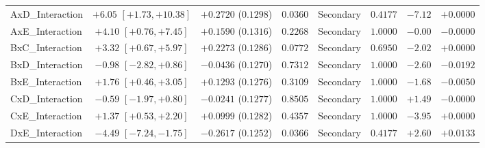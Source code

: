 \documentclass[10pt,journal,compsoc]{IEEEtran}
\begin{document}
\begin{table}[!t]
\begin{adjustbox}{max width=\textwidth}
\begin{tabular}{@{}lccccccc@{}}
AxD\_Interaction & $+6.05$ $[+1.73, +10.38]$ & $+0.2720$ ($0.1298$) & $0.0360$ & Secondary & $0.4177$ & $-7.12$ & $+0.0000$ \\
AxE\_Interaction & $+4.10$ $[+0.76, +7.45]$ & $+0.1590$ ($0.1316$) & $0.2268$ & Secondary & $1.0000$ & $-0.00$ & $-0.0000$ \\
BxC\_Interaction & $+3.32$ $[+0.67, +5.97]$ & $+0.2273$ ($0.1286$) & $0.0772$ & Secondary & $0.6950$ & $-2.02$ & $+0.0000$ \\
BxD\_Interaction & $-0.98$ $[-2.82, +0.86]$ & $-0.0436$ ($0.1270$) & $0.7312$ & Secondary & $1.0000$ & $-2.60$ & $-0.0192$ \\
BxE\_Interaction & $+1.76$ $[+0.46, +3.05]$ & $+0.1293$ ($0.1276$) & $0.3109$ & Secondary & $1.0000$ & $-1.68$ & $-0.0050$ \\
CxD\_Interaction & $-0.59$ $[-1.97, +0.80]$ & $-0.0241$ ($0.1277$) & $0.8505$ & Secondary & $1.0000$ & $+1.49$ & $-0.0000$ \\
CxE\_Interaction & $+1.37$ $[+0.53, +2.20]$ & $+0.0999$ ($0.1282$) & $0.4357$ & Secondary & $1.0000$ & $-3.95$ & $+0.0000$ \\
DxE\_Interaction & $-4.49$ $[-7.24, -1.75]$ & $-0.2617$ ($0.1252$) & $0.0366$ & Secondary & $0.4177$ & $+2.60$ & $+0.0133$ \\
\bottomrule
\end{tabular}
\end{adjustbox}
\end{table}
\end{document}
